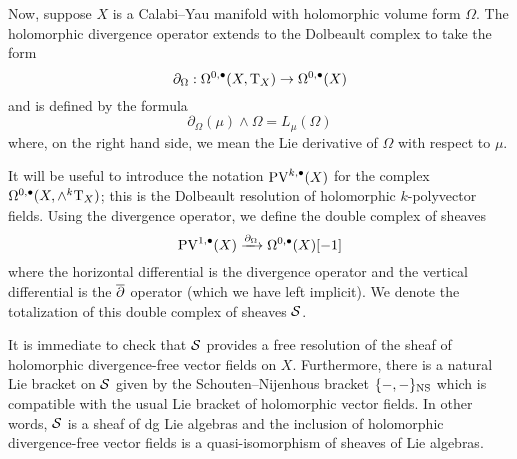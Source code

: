 \documentclass[11pt]{amsart}
\def\pv{{\rm PV}}
\def\PV{{\rm PV}}
\def\T{{\rm T}}
\begin{document}
Now, suppose $X$ is a Calabi--Yau manifold with holomorphic volume form $\Omega$.
The holomorphic divergence operator extends to the Dolbeault complex to take the form
\[
  \partial_\Omega : \Omega^{0,\bu}(X, \T_X) \to \Omega^{0,\bu}(X)
\]
and is defined by the formula
\[
  \partial_\Omega (\mu) \wedge \Omega = L_\mu (\Omega)
\]
where, on the right hand side, we mean the Lie derivative of $\Omega$ with respect to $\mu$.

It will be useful to introduce the notation $\PV^{k,\bu}(X)$ for the complex $\Omega^{0,\bu}(X, \wedge^k \T_X)$; this is the Dolbeault resolution of holomorphic $k$-polyvector fields. 
Using the divergence operator, we define the double complex of sheaves
\[
\PV^{1,\bu}(X) \xto{\partial_\Omega} \Omega^{0,\bu}(X) [-1] 
\]
where the horizontal differential is the divergence operator and the vertical differential is the $\overline{\partial}$ operator (which we have left implicit). 
We denote the totalization of this double complex of sheaves $\mathcal S$. 

It is immediate to check that $\mathcal S$ provides a free resolution of the sheaf of holomorphic divergence-free vector fields on $X$.
Furthermore, there is a natural Lie bracket on $\mathcal S$ given by the Schouten--Nijenhous bracket $\{-,-\}_{\rm NS}$ which is compatible with the usual Lie bracket of holomorphic vector fields. 
In other words, $\mathcal S$ is a sheaf of dg Lie algebras and the inclusion of holomorphic divergence-free vector fields is a quasi-isomorphism of sheaves of Lie algebras.







\end{document}
